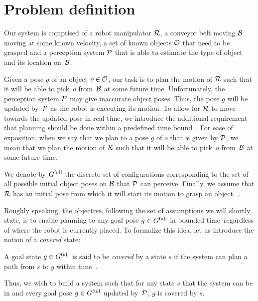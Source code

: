 \documentclass[conference]{IEEEtran}
\begin{document}
\section{Problem definition}
Our system is comprised of 
a robot manipulator $\mathcal{R}$,
a conveyor belt moving $\mathcal{B}$ moving at some known velocity,
a set of known objects $\mathcal{O}$ that need to be grasped and 
a perception system $\mathcal{P}$ that is able to estimate the type of object and its location on~$\mathcal{B}$.

Given a pose $g$ of an object $o \in \mathcal{O}$, our task is to plan the motion of $\mathcal{R}$ such that it will be able to pick~$o$ from~$\mathcal{B}$ at some future time.
%
Unfortunately, the perception system $\mathcal{P}$ may give inaccurate object poses.
Thus, the pose $g$ will be updated by~$\mathcal{P}$ as the robot is executing its motion. 
To allow for $\mathcal{R}$ to move towards the updated pose in real time, we introduce the additional requirement that planning should be done within a predefined time bound~\Tbound.
%
For ease of exposition, when we say that we plan to a pose $g$ of $o$ that is given by $\mathcal{P}$, 
we mean that we plan the motion of $\mathcal{R}$ such that it will be able to pick~$o$ from~$\mathcal{B}$ at some future time. 

%
We denote by $G^{\textrm{full}}$ the discrete set of configurations corresponding to the set of all possible initial object poses on $\mathcal{B}$ that $\mathcal{P}$ can perceive.
%
Finally, we assume that $\mathcal{R}$ has an initial pose \Shome from which it will start its motion to grasp an object.
.

Roughly speaking, the objective, following the set of assumptions we will shortly state, is to enable planning to any goal pose $ g \in G^{\textrm{full}}$ in bounded time~\Tbound regardless of where the robot is currently placed.
To formalize this idea, let us introduce the notion of a \emph{covered} state:
\begin{definition}
    A goal state $g \in G^{\textrm{full}}$ is said to be \emph{covered} by a state $s$ if 
    the system can plan a path from $s$ to $g$ within time~\Tbound.
\end{definition}

Thus, we wish to build a system such that 
for any state $s$ that the system can be in 
and every goal pose $g \in G^{\textrm{full}}$ updated by~$\mathcal{P}$,
$g$ is covered by $s$.
\end{document}
